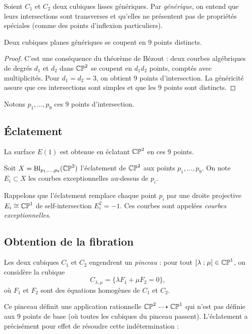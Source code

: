 Soient $C_1$ et $C_2$ deux cubiques lisses génériques. Par \emph{générique}, on entend que leurs intersections sont transverses et qu'elles ne présentent pas de propriétés spéciales (comme des points d'inflexion particuliers).

\begin{lemme}
Deux cubiques planes génériques se coupent en 9 points distincts.
\end{lemme}

\begin{proof}
C'est une conséquence du théorème de Bézout : deux courbes algébriques de degrés $d_1$ et $d_2$ dans $\mathbb{CP}^2$ se coupent en $d_1 d_2$ points, comptés avec multiplicités. Pour $d_1 = d_2 = 3$, on obtient 9 points d'intersection. La généricité assure que ces intersections sont simples et que les 9 points sont distincts.
\end{proof}

Notons $p_1, \dots, p_9$ ces 9 points d'intersection.

\subsection{Éclatement}

La surface $E(1)$ est obtenue en éclatant $\mathbb{CP}^2$ en ces 9 points.

\begin{definition}
Soit $X = \operatorname{Bl}_{p_1, \dots, p_9}(\mathbb{CP}^2)$ l'éclatement de $\mathbb{CP}^2$ aux points $p_1, \dots, p_9$. On note $E_i \subset X$ les courbes exceptionnelles au-dessus de $p_i$.
\end{definition}

Rappelons que l'éclatement remplace chaque point $p_i$ par une droite projective $E_i \cong \mathbb{CP}^1$ de self-intersection $E_i^2 = -1$. Ces courbes sont appelées \emph{courbes exceptionnelles}.

\subsection{Obtention de la fibration}

Les deux cubiques $C_1$ et $C_2$ engendrent un \emph{pinceau} : pour tout $[\lambda : \mu] \in \mathbb{CP}^1$, on considère la cubique
\[
C_{\lambda, \mu} = \{ \lambda F_1 + \mu F_2 = 0 \},
\]
où $F_1$ et $F_2$ sont des équations homogènes de $C_1$ et $C_2$.

Ce pinceau définit une application rationnelle $\mathbb{CP}^2 \dashrightarrow \mathbb{CP}^1$ qui n'est pas définie aux 9 points de base (où toutes les cubiques du pinceau passent). L'éclatement a précisément pour effet de résoudre cette indétermination :

